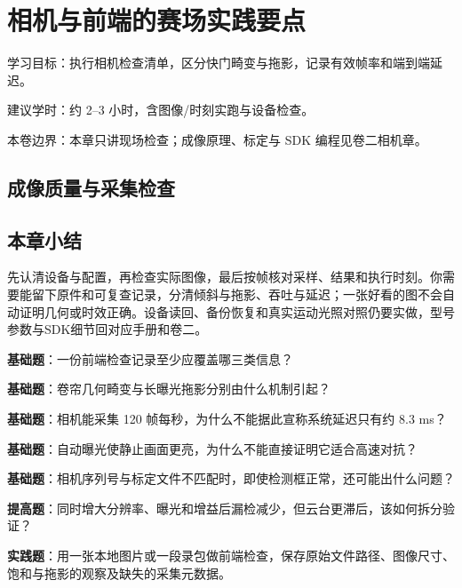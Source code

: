 \documentclass[
  lang=cn,
  scheme=chinese,
  chinesefont=ctexfont,
  11pt,
  oneside,
  device=normal,
  color=cyan,
  mode=fancy
]{elegantbook}
\begin{document}
\chapter{相机与前端的赛场实践要点}
\begin{introduction}
  \item 学习目标：执行相机检查清单，区分快门畸变与拖影，记录有效帧率和端到端延迟。
  \item 建议学时：约 2--3 小时，含图像/时刻实跑与设备检查。
  \item 本卷边界：本章只讲现场检查；成像原理、标定与 SDK 编程见卷二相机章。
\end{introduction}
\label{ch:v3-camera}

\section{成像质量与采集检查}


\clearpage
\section{本章小结}
\begin{conclusion}
先认清设备与配置，再检查实际图像，最后按帧核对采样、结果和执行时刻。你需要能留下原件和可复查记录，分清倾斜与拖影、吞吐与延迟；一张好看的图不会自动证明几何或时效正确。设备读回、备份恢复和真实运动光照对照仍要实做，型号参数与SDK细节回对应手册和卷二。
\end{conclusion}

\begin{problemset}
\item \label{v3-prob-camera-1}\textbf{基础题}：一份前端检查记录至少应覆盖哪三类信息？
\item \label{v3-prob-camera-2}\textbf{基础题}：卷帘几何畸变与长曝光拖影分别由什么机制引起？
\item \label{v3-prob-camera-3}\textbf{基础题}：相机能采集 120 帧每秒，为什么不能据此宣称系统延迟只有约 8.3 ms？
\item \label{v3-prob-camera-4}\textbf{基础题}：自动曝光使静止画面更亮，为什么不能直接证明它适合高速对抗？
\item \label{v3-prob-camera-5}\textbf{基础题}：相机序列号与标定文件不匹配时，即使检测框正常，还可能出什么问题？
\item \label{v3-prob-camera-6}\textbf{提高题}：同时增大分辨率、曝光和增益后漏检减少，但云台更滞后，该如何拆分验证？
\item \label{v3-prob-camera-7}\textbf{实践题}：用一张本地图片或一段录包做前端检查，保存原始文件路径、图像尺寸、饱和与拖影的观察及缺失的采集元数据。
\end{problemset}
\end{document}
